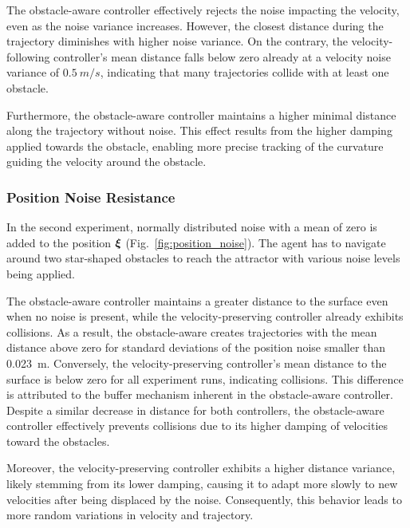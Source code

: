 The obstacle-aware controller effectively rejects the noise impacting the velocity, even as the noise variance increases. However, the closest distance during the trajectory diminishes with higher noise variance. On the contrary, the velocity-following controller's mean distance falls below zero already at a velocity noise variance of $\qty{0.5}{m/s}$, indicating that many trajectories collide with at least one obstacle.

Furthermore, the obstacle-aware controller maintains a higher minimal distance along the trajectory without noise. This effect results from the higher damping applied towards the obstacle, enabling more precise tracking of the curvature guiding the velocity around the obstacle.
\fi

\iflong
\subsubsection{Position Noise Resistance} \label{sec:position_noise}
In the second experiment, normally distributed noise with a mean of zero is added to the position $\boldsymbol{ \xi}$ (Fig.~\ref{fig:position_noise}). The agent has to navigate around two star-shaped obstacles to reach the attractor with various noise levels being applied.

The obstacle-aware controller maintains a greater distance to the surface even when no noise is present, while the velocity-preserving controller already exhibits collisions. As a result, the obstacle-aware creates trajectories with the mean distance above zero for standard deviations of the position noise smaller than \qty{0.023}{m}. Conversely, the velocity-preserving controller's mean distance to the surface is below zero for all experiment runs, indicating collisions.
This difference is attributed to the buffer mechanism inherent in the obstacle-aware controller. Despite a similar decrease in distance for both controllers, the obstacle-aware controller effectively prevents collisions due to its higher damping of velocities toward the obstacles.

Moreover, the velocity-preserving controller exhibits a higher distance variance, likely stemming from its lower damping, causing it to adapt more slowly to new velocities after being displaced by the noise. Consequently, this behavior leads to more random variations in velocity and trajectory.

